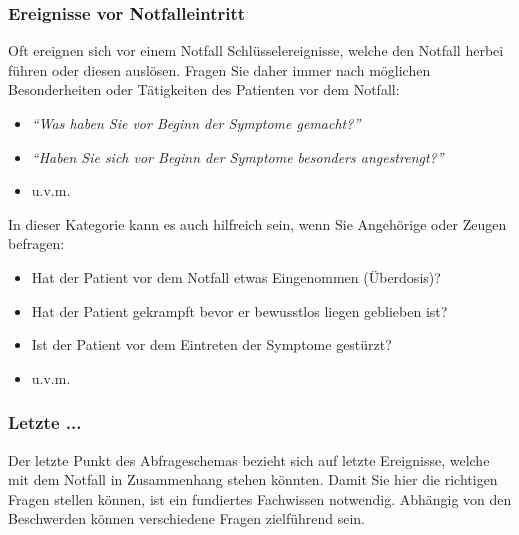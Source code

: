
\subsubsection{Ereignisse vor Notfalleintritt}
Oft ereignen sich vor einem Notfall Schlüsselereignisse, welche den Notfall
herbei führen oder diesen auslösen. Fragen Sie daher immer nach möglichen
Besonderheiten oder Tätigkeiten des Patienten vor dem Notfall:
\begin{itemize}
    \item \emph{"`Was haben Sie vor Beginn der Symptome
    gemacht?"'}
    \item \emph{"`Haben Sie sich vor Beginn der Symptome
    besonders angestrengt?"'}
    \item u.v.m.
\end{itemize}
In dieser Kategorie kann es auch hilfreich sein, wenn Sie Angehörige oder Zeugen befragen:
\begin{itemize}
    \item Hat der Patient vor dem Notfall etwas Eingenommen (Überdosis)?
    \item Hat der Patient gekrampft bevor er bewusstlos liegen geblieben ist?
    \item Ist der Patient vor dem Eintreten der Symptome gestürzt?
    \item u.v.m.
\end{itemize}

\subsubsection{Letzte ...}
Der letzte Punkt des Abfrageschemas bezieht sich auf letzte
Ereignisse, welche mit dem Notfall in Zusammenhang stehen
könnten. Damit Sie hier die richtigen Fragen stellen können,
ist ein fundiertes Fachwissen notwendig. Abhängig von den
Beschwerden können verschiedene Fragen zielführend sein.

